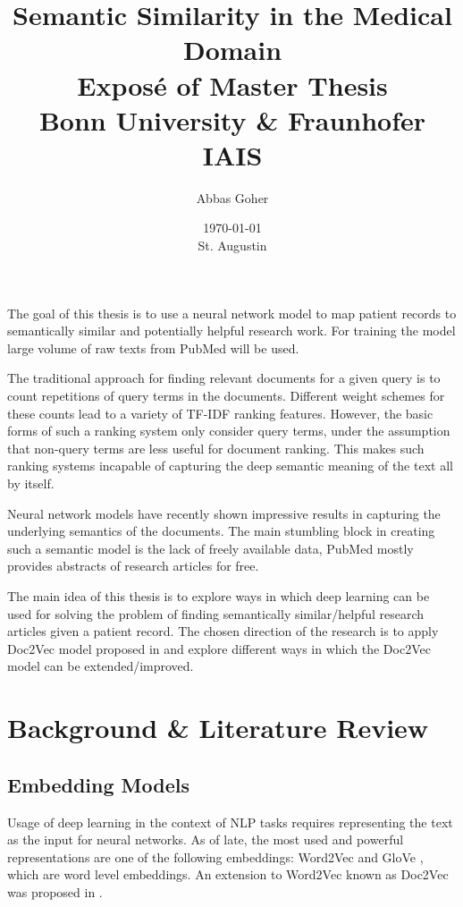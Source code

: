 \documentclass[12pt,a4paper] {article}
\begin{document}
	
	\title{Semantic Similarity in the Medical Domain \\ \hphantom \newline
		\large     Expos\'{e} of Master Thesis
		\\Bonn University \& Fraunhofer IAIS}
	\author{Abbas Goher}
	\date{ \today \\ St. Augustin}
	\maketitle
	
	The goal of this thesis is to use a neural network model to map patient records to semantically similar and potentially helpful research work. For training the model large volume of raw texts from PubMed \cite{pubmed}  will be used.
	
	
	The traditional approach for finding relevant documents for a given query is to count repetitions of query terms in the documents. Different weight schemes for these counts lead to a variety of TF-IDF ranking features. However, the basic forms of such a ranking system only consider query terms, under the assumption that non-query terms are less useful for document ranking. This makes such ranking systems incapable of capturing the deep semantic meaning of the text all by itself. 
	
	Neural network models have recently shown impressive results in capturing the underlying semantics of the documents\cite{Bengio2006}.
	The main stumbling block in creating such a semantic model is the lack of freely available data, PubMed mostly provides abstracts of research articles for free. 
	
	The main idea of this thesis is to explore ways in which deep learning can be used for solving the problem of finding semantically similar/helpful research articles given a patient record. The chosen direction of the research is to apply Doc2Vec model proposed in \cite{le2014distributed} and explore different ways in which the Doc2Vec model can be extended/improved.
	
	\section*{Background \& Literature Review}
	
	\subsection*{Embedding Models}
	Usage of deep learning in the context of NLP tasks requires representing the text as the input for neural networks. As of late, the most used and powerful representations are one of the following embeddings: Word2Vec \cite{mikolov2013efficient} and GloVe \cite{pennington2014glove}, which are word level embeddings. An extension to Word2Vec known as Doc2Vec was proposed in \cite{le2014distributed}.  
	
\end{document}
